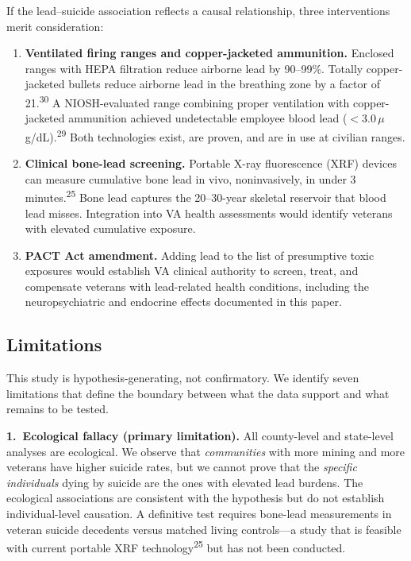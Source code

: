 \documentclass[11pt,twocolumn]{article}
\begin{document}
If the lead--suicide association reflects a causal relationship, three interventions merit consideration:

\begin{enumerate}[leftmargin=*, itemsep=2pt]
\item \textbf{Ventilated firing ranges and copper-jacketed ammunition.} Enclosed ranges with HEPA filtration reduce airborne lead by 90--99\%. Totally copper-jacketed bullets reduce airborne lead in the breathing zone by a factor of 21.\textsuperscript{30} A NIOSH-evaluated range combining proper ventilation with copper-jacketed ammunition achieved undetectable employee blood lead ($<$3.0\,$\mu$g/dL).\textsuperscript{29} Both technologies exist, are proven, and are in use at civilian ranges.
\item \textbf{Clinical bone-lead screening.} Portable X-ray fluorescence (XRF) devices can measure cumulative bone lead in vivo, noninvasively, in under 3 minutes.\textsuperscript{25} Bone lead captures the 20--30-year skeletal reservoir that blood lead misses. Integration into VA health assessments would identify veterans with elevated cumulative exposure.
\item \textbf{PACT Act amendment.} Adding lead to the list of presumptive toxic exposures would establish VA clinical authority to screen, treat, and compensate veterans with lead-related health conditions, including the neuropsychiatric and endocrine effects documented in this paper.
\end{enumerate}


\subsection{Limitations}

This study is hypothesis-generating, not confirmatory. We identify seven limitations that define the boundary between what the data support and what remains to be tested.

\textbf{1.~Ecological fallacy (primary limitation).} All county-level and state-level analyses are ecological. We observe that \textit{communities} with more mining and more veterans have higher suicide rates, but we cannot prove that the \textit{specific individuals} dying by suicide are the ones with elevated lead burdens. The ecological associations are consistent with the hypothesis but do not establish individual-level causation. A definitive test requires bone-lead measurements in veteran suicide decedents versus matched living controls---a study that is feasible with current portable XRF technology\textsuperscript{25} but has not been conducted.
\end{document}
